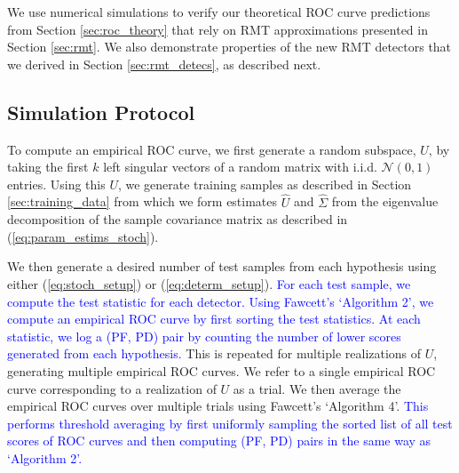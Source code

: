 We use numerical simulations to verify our theoretical ROC curve predictions from Section \ref{sec:roc_theory} that rely on RMT approximations presented in Section \ref{sec:rmt}. We also demonstrate properties of the new RMT detectors that we derived in Section \ref{sec:rmt_detecs}, as described next.


\subsection{Simulation Protocol}\label{sec:sim_proto}

To compute an empirical ROC curve, we first generate a random subspace, $U$, by taking the first $k$ left singular vectors of a random matrix with i.i.d. $\mathcal{N}(0,1)$ entries. Using this $U$, we generate training samples as described in Section \ref{sec:training_data} from which we form estimates $\widehat{U}$ and $\widehat{\Sigma}$ from the eigenvalue decomposition of the sample covariance matrix as described in (\ref{eq:param_estims_stoch}).

We then generate a desired number of test samples from each hypothesis using either (\ref{eq:stoch_setup}) or (\ref{eq:determ_setup}). \textcolor{blue}{For each test sample, we compute the test statistic for each detector. Using Fawcett's \cite{fawcett2006introduction} `Algorithm 2', we compute an empirical ROC curve by first sorting the test statistics. At each statistic, we log a (PF, PD) pair by counting the number of lower scores generated from each hypothesis.} This is repeated for multiple realizations of $U$, generating multiple empirical ROC curves. We refer to a single empirical ROC curve corresponding to a realization of $U$ as a trial. We then average the empirical ROC curves over multiple trials using Fawcett's \cite{fawcett2006introduction} `Algorithm 4'. \textcolor{blue}{This performs threshold averaging by first uniformly sampling the sorted list of all test scores of ROC curves and then computing (PF, PD) pairs in the same way as `Algorithm 2'.}


